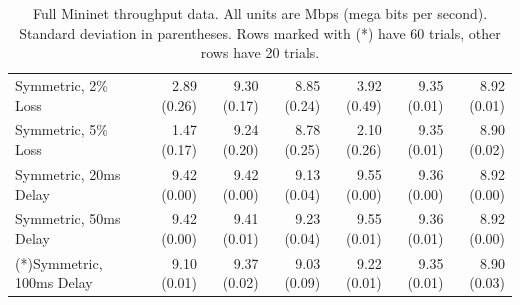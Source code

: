 \documentclass{cwru}
\begin{document}
\begin{table}[H]
{\begin{tabular}{l|rrrrrr}
Symmetric, 2\% Loss & 2.89 (0.26) & 9.30 (0.17) & 8.85 (0.24) & 3.92 (0.49) & 9.35 (0.01) & 8.92 (0.01) \\
Symmetric, 5\% Loss & 1.47 (0.17) & 9.24 (0.20) & 8.78 (0.25) & 2.10 (0.26) & 9.35 (0.01) & 8.90 (0.02) \\
Symmetric, 20ms Delay & 9.42 (0.00) & 9.42 (0.00) & 9.13 (0.04) & 9.55 (0.00) & 9.36 (0.00) & 8.92 (0.00) \\
Symmetric, 50ms Delay & 9.42 (0.00) & 9.41 (0.01) & 9.23 (0.04) & 9.55 (0.01) & 9.36 (0.01) & 8.92 (0.00) \\
(*)Symmetric, 100ms Delay & 9.10 (0.01) & 9.37 (0.02) & 9.03 (0.09) & 9.22 (0.01) & 9.35 (0.01) & 8.90 (0.03) \\
\end{tabular}
}
\caption[Mininet experiment throughput]{
  Full Mininet throughput data. All units are Mbps (mega bits per second).
  Standard deviation in parentheses. Rows marked with (*) have 60 trials, other
  rows have 20 trials.
}
\end{table}



\end{document}
